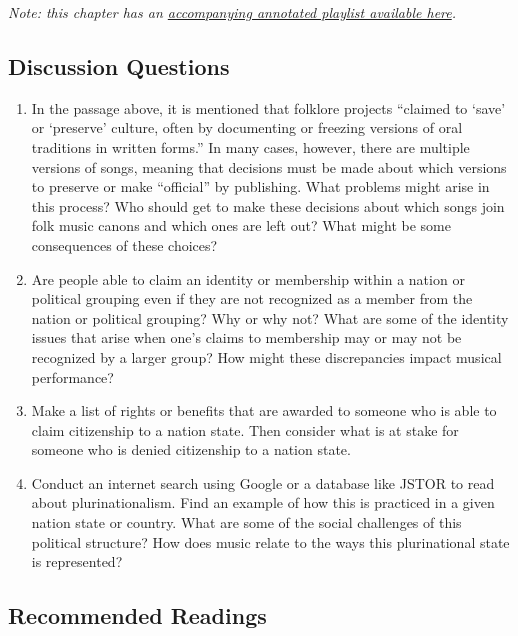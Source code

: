 \documentclass[twoside]{article}
\begin{document}
\emph{Note: this chapter has an \href{https://worldmusictextbook.org/nielsen-vallejo-2022}{accompanying annotated
playlist available here}.}

\hypertarget{discussion-questions}{%
\subsection*{Discussion Questions}\label{discussion-questions}}

\begin{enumerate}
\def\labelenumi{\arabic{enumi}.}
\item
  In the passage above, it is mentioned that folklore projects ``claimed
  to `save' or `preserve' culture, often by documenting or freezing
  versions of oral traditions in written forms.'' In many cases,
  however, there are multiple versions of songs, meaning that decisions
  must be made about which versions to preserve or make ``official'' by
  publishing. What problems might arise in this process? Who should get
  to make these decisions about which songs join folk music canons and
  which ones are left out? What might be some consequences of these
  choices?
\item
  Are people able to claim an identity or membership within a nation or
  political grouping even if they are not recognized as a member from
  the nation or political grouping? Why or why not? What are some of the
  identity issues that arise when one's claims to membership may or may
  not be recognized by a larger group? How might these discrepancies
  impact musical performance?
\item
  Make a list of rights or benefits that are awarded to someone who is
  able to claim citizenship to a nation state. Then consider what is at
  stake for someone who is denied citizenship to a nation state.
\item
  Conduct an internet search using Google or a database like JSTOR to
  read about plurinationalism. Find an example of how this is practiced
  in a given nation state or country. What are some of the social
  challenges of this political structure? How does music relate to the
  ways this plurinational state is represented?
\end{enumerate}

\hypertarget{recommended-readings}{%
\subsection*{Recommended Readings}\label{recommended-readings}}
\end{document}
